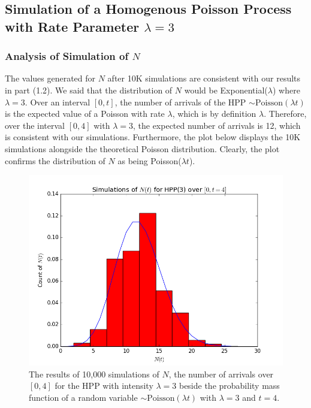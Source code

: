 \documentclass[11pt, oneside]{article}   	%
\begin{document}
\subsection{Simulation of a Homogenous Poisson Process with Rate Parameter $\lambda=3$}
\subsubsection{Analysis of Simulation of $N$}
The values generated for $N$ after 10K simulations are consistent with our results in part (1.2). We said that the distribution of $N$ would be Exponential($\lambda$) where $\lambda=3$. Over an interval $[0,t]$, the number of arrivals of the HPP $\sim \text{Poisson}(\lambda t)$ is the expected value of a Poisson with rate $\lambda$, which is by definition $\lambda$. Therefore, over the interval $[0,4]$ with $\lambda=3$, the expected number of arrivals is 12, which is consistent with our simulations. Furthermore, the plot below displays the 10K simulations alongside the theoretical Poisson distribution. Clearly, the plot confirms the distribution of $N$ as being Poisson($\lambda t$). 
\begin{figure}[H]
\includegraphics[scale=.5]{hpp_nt}
\caption{The results of 10,000 simulations of $N$, the number of arrivals over $[0,4]$ for the HPP with intensity $\lambda=3$ beside the probability mass function of a random variable $\sim \text{Poisson}(\lambda t)$ with $\lambda=3$ and $t=4$.}
\label{fig:x}
\end{figure}
\end{document}
